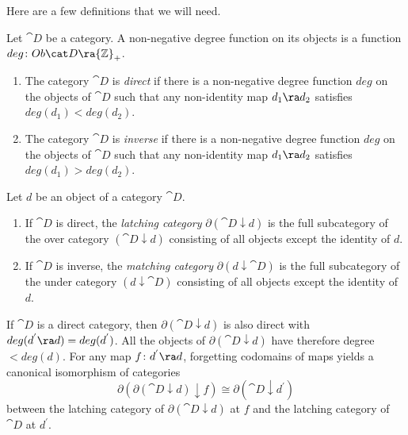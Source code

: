 Here are a few definitions that we will need.

\begin{defn}
\label{def:directinvcat}
\mbox{}
Let ${\cat D}$ be a category. A non-negative degree function on its objects is a function $deg \colon Ob {\cat D} \ra {\mathbb Z}_+$.
\begin{enumerate}
\item
The category ${\cat D}$ is {\it direct} if there is a non-negative degree function $deg$ on the objects of ${\cat D}$ such that any non-identity map $d_1 \ra d_2$ satisfies $deg(d_1) < deg(d_2)$.
\item
The category ${\cat D}$ is {\it inverse}  if there is a non-negative degree function $deg$ on the objects of ${\cat D}$ such that any non-identity map $d_1 \ra d_2$ satisfies $deg(d_1) > deg(d_2)$.
\end{enumerate}
\end{defn}

\begin{defn}
\label{def:latchingmatchingcat}
Let $d$ be an object of a category ${\cat D}$.
\begin{enumerate}
\item
If ${\cat D}$ is direct, the {\it latching category} $\partial({\cat D} \downarrow d)$ is the full subcategory of the over category $({\cat D} \downarrow d)$ consisting of all objects except the identity of $d$. 
\item
If ${\cat D}$ is inverse, the {\it matching category} $\partial(d \downarrow {\cat D})$ is the full subcategory of the under category $(d \downarrow {\cat D})$ consisting of all objects except the identity of $d$.
\end{enumerate}
\end{defn}

If ${\cat D}$ is a direct category, then $\partial({\cat D} \downarrow d)$ is also direct with $deg(d^{'} \ra d) = deg (d^{'})$. All the objects of $\partial({\cat D} \downarrow d)$ have therefore degree $< deg(d)$. For any map $f \colon d^{'} \ra d$, forgetting codomains of maps yields a canonical isomorphism of categories 
\begin{equation}
\label{eqn:latchlatch}
\partial(\partial({\cat D} \downarrow d) \downarrow f) \cong \partial ({\cat D} \downarrow d^{'})
\end{equation}
between the latching category of $\partial({\cat D} \downarrow d)$ at $f$ and the latching category of ${\cat D}$ at $d^{'}$.


